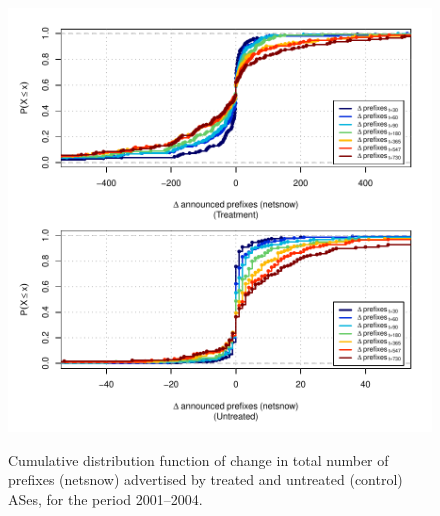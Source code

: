 \begin{figure}[H]
\begin{centering}
\begin{singlespace}
    \includegraphics[width=6in]{figures/behavior-netsnow-2001_2004-corr.pdf}
    \vspace{-2em}\\
    \caption{Cumulative distribution function of change in total number of prefixes (netsnow) advertised by treated and untreated (control) ASes, for the period 2001--2004.}
\end{singlespace}
\end{centering}
\end{figure}
